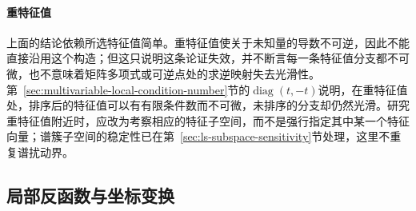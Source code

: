 \paragraph{重特征值}
上面的结论依赖所选特征值简单。重特征值使关于未知量的导数不可逆，因此不能直接沿用这个构造；但这只说明这条论证失效，并不断言每一条特征值分支都不可微，也不意味着矩阵多项式或可逆点处的求逆映射失去光滑性。第~\ref{sec:multivariable-local-condition-number}节的$\operatorname{diag}(t,-t)$说明，在重特征值处，排序后的特征值可以有有限条件数而不可微，未排序的分支却仍然光滑。研究重特征值附近时，应改为考察相应的特征子空间，而不是强行指定其中某一个特征向量；谱簇子空间的稳定性已在第~\ref{sec:ls-subspace-sensitivity}节处理，这里不重复谱扰动界。

\subsection{局部反函数与坐标变换}

